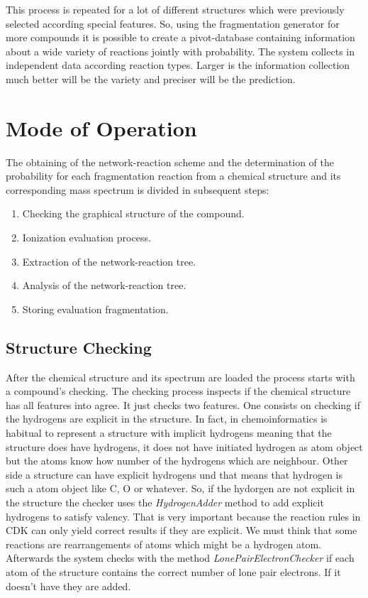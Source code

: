 \documentclass[10pt]{bmc_article}
\newenvironment{bmcformat}{\begin{raggedright}\baselineskip20pt\sloppy\setboolean{publ}{false}}{\end{raggedright}\baselineskip20pt\sloppy}
\begin{document}
\begin{bmcformat}
This process is repeated for a lot of different structures which were 
previously selected according special features. So, using the fragmentation 
generator for more compounds it is possible to create a pivot-database 
containing information about a wide variety of reactions jointly with 
probability. The system collects in independent data according reaction types. 
Larger is the information collection much better will be the variety and 
preciser will be the prediction.

\section{Mode of Operation}

The obtaining of the network-reaction scheme and the determination of the 
probability for each fragmentation reaction from a chemical structure and its 
corresponding mass spectrum is divided in subsequent steps:

\begin{enumerate}
\item Checking the graphical structure of the compound.
\item Ionization evaluation process.
\item Extraction of the network-reaction tree.
\item Analysis of the network-reaction tree.
\item Storing evaluation fragmentation.
\end{enumerate}

\subsection{Structure Checking}

After the chemical structure and its spectrum are loaded the process starts 
with a compound's checking. The checking process inspects if the chemical 
structure has all features into agree. It just checks two features. One 
consists on checking if the hydrogens are explicit in the structure. In fact, 
in chemoinformatics is habitual to represent a structure with implicit 
hydrogens meaning that the structure does have hydrogens, it does not have 
initiated hydrogen as atom object but the atoms know how number of the 
hydrogens which are neighbour. Other side a structure can have explicit 
hydrogens und that means that hydrogen is such a atom object like C,  O or 
whatever. So, if the hydorgen are not explicit in the structure the checker 
uses the \emph{HydrogenAdder} method to add explicit hydrogens to satisfy 
valency. That is very important because the reaction rules in CDK can only 
yield correct results if they are explicit. We must think that some reactions 
are rearrangements of atoms which might be a hydrogen atom. Afterwards the 
system checks with the method \emph{LonePairElectronChecker} if each atom of 
the structure contains the correct number of lone pair electrons. If it doesn't 
have they are added.


\end{bmcformat}
\end{document}
